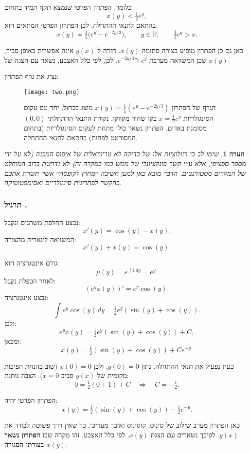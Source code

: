 \documentclass{article}
\numberwithin{equation}{section}
\newcounter{solution}[section]
\renewcommand{\thesolution}{\thesection.\arabic{solution}}
\newcommand{\solution}{%
  \refstepcounter{solution}%
  \subsubsection*{תרגיל \thesolution}%
  \label{sol:\thesolution}%
}
\newtheorem{remark}{הערה}[section]
\begin{document}
כלומר, הפתרון הפרטי שנמצא תקף תמיד בתחום
\[
x(y) < \tfrac{1}{2}e^y,
\]
בהתאם לתנאי ההתחלה. לכן הפתרון הפרטי המתאים הוא:
\[
\boxed{\, x(y) = \tfrac{1}{5}\big(e^y - e^{-2y/3}\big), \qquad y\in\mathbb{R} ,\qquad \tfrac{1}{2}e^y > x. \,}
\]

כאן גם כן הפתרון מופיע בצורה סתומה $x(y)$. חזרה ל־$y(x)$ אינה אפשרית באופן סביר, שכן המשוואה מערבת $e^y$ ו־$e^{-2y/3}$. לכן, לפי כלל האצבע, נשאר עם הצגה של $x(y)$.

נציג את גרף הפתרון:
\begin{figure}[H]
    \centering
    \texttt{[image: two.png]}
    \caption{הגרף של הפתרון $x(y) = \tfrac{1}{5}\left(e^y - e^{-2y/3}\right)$ 
    מוצג בכחול, יחד עם עקום הסינגולריות $x=\tfrac{1}{2}e^y$ בקו שחור מקווקו. 
    נקודת התנאי ההתחלתי $(0,0)$ מסומנת באדום. הפתרון נשאר כולו מתחת לעקום הסינגולריות (בתחום המסורטט לפחות) בהתאם לתנאי ההתחלה.}
    \label{fig:solution_vs_singularity}
\end{figure}
\begin{remark}
    שימו לב כי רזולוציות אלו של בדיקה לא טריוויאלית של איפוס המכנה (לא על ידי מספר ספציפי, אלא ע׳׳י קשר פונקציונלי של ממש כמו במקרה זה) לא נדרשת ברוב המוחלט של המקרים מסטודנטים. הדבר מובא כאן למען חשיבה ׳׳מחוץ לקופסה׳׳ אשר תשרת אתכם בהקשר לפתרונות סינגולריים ואסימפטוטיקה.
\end{remark}

\solution{}
נבצע החלפת משתנים ונקבל:
\[
x'(y) = \cos(y) - x(y).
\]
המשוואה לינארית מהצורה:
\[
x'(y) + x(y) = \cos(y).
\]

גורם אינטגרציה הוא:
\[
\mu(y) = e^{\int 1\,dy} = e^y.
\]
לאחר הכפלה נקבל:
\[
(e^y x(y))' = e^y \cos(y).
\]
נבצע אינטגרציה:
\[
\int e^y \cos(y)\,dy = \tfrac{1}{2} e^y(\sin(y)+\cos(y)).
\]
ולכן:
\[
e^y x(y) = \tfrac{1}{2} e^y(\sin(y)+\cos(y)) + C,
\]
ומכאן:
\[
x(y) = \tfrac{1}{2}(\sin(y)+\cos(y)) + C e^{-y}.
\]

כעת נפעיל את תנאי ההתחלה. נתון $y(0)=0$, ולכן $x(0)=0$ (שוב בהנחת הפיכות מקומית של $y(x)$ סביב $x=0$). הצבה נותנת:
\[
0 = \tfrac{1}{2}(0+1) + C \quad \Rightarrow \quad C=-\tfrac{1}{2}.
\]

הפתרון הפרטי יהיה:
\[
\boxed{\, x(y) = \tfrac{1}{2}(\sin(y)+\cos(y)) - \tfrac{1}{2} e^{-y}. \,}
\]

כאן הפתרון מערב שילוב של סינוס, קוסינוס ואיבר מעריכי, כך שאין דרך פשוטה לבודד את $y(x)$. לפיכך נשארים עם הצגת $x(y)$. לפי כלל האצבע, זהו מקרה שבו \textbf{הפתרון נשאר בצורתו הסגורה $x(y)$}.
\end{document}
